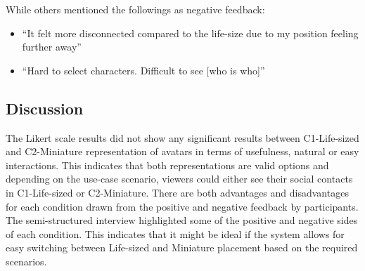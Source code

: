While others mentioned the followings as negative feedback: 

\begin{itemize}
    \item \enquote{It felt more disconnected compared to the life-size due to my position feeling further away}
    \item \enquote{Hard to select characters. Difficult to see [who is who]}
\end{itemize}

\subsection{Discussion}




The Likert scale results did not show any significant results between C1-Life-sized and C2-Miniature representation of avatars in terms of usefulness, natural or easy interactions. This indicates that both representations are valid options and depending on the use-case scenario, viewers could either see their social contacts in C1-Life-sized or C2-Miniature. There are both advantages and disadvantages for each condition drawn from the positive and negative feedback by participants. The semi-structured interview highlighted some of the positive and negative sides of each condition. This indicates that it might be ideal if the system allows for easy switching between Life-sized and Miniature placement based on the required scenarios. 


